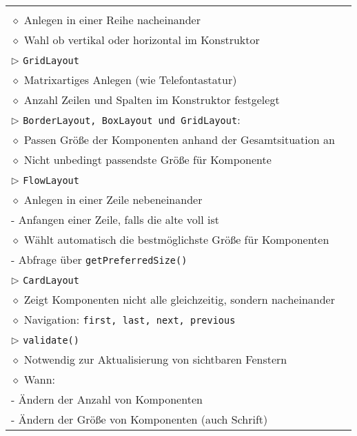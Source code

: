 \begin{longtable}{ | p{} p{} | }
{	$\rhd$ \texttt{BoxLayout} \\ 
	\hspace{0.4cm} $\diamond$ Anlegen in einer Reihe nacheinander \\
	\hspace{0.4cm} $\diamond$ Wahl ob vertikal oder horizontal im Konstruktor \\
	$\rhd$ \texttt{GridLayout} \\
	\hspace{0.4cm} $\diamond$ Matrixartiges Anlegen (wie Telefontastatur) \\
	\hspace{0.4cm} $\diamond$ Anzahl Zeilen und Spalten im Konstruktor festgelegt \\
	$\rhd$ \texttt{BorderLayout, BoxLayout und GridLayout}: \\
	\hspace{0.4cm} $\diamond$ Passen Größe der Komponenten anhand der Gesamtsituation an \\
	\hspace{0.4cm} $\diamond$ Nicht unbedingt passendste Größe für Komponente \\
	$\rhd$ \texttt{FlowLayout} \\
	\hspace{0.4cm} $\diamond$ Anlegen in einer Zeile nebeneinander \\
	\hspace{0.6cm} - Anfangen einer Zeile, falls die alte voll ist \\
	\hspace{0.4cm} $\diamond$ Wählt automatisch die bestmöglichste Größe für Komponenten \\
	\hspace{0.6cm} - Abfrage über \texttt{getPreferredSize()} \\
	$\rhd$ \texttt{CardLayout} \\
	\hspace{0.4cm} $\diamond$ Zeigt Komponenten nicht alle gleichzeitig, sondern nacheinander \\
	\hspace{0.4cm} $\diamond$ Navigation: \texttt{first, last, next, previous} \\
	$\rhd$ \texttt{validate()} \\
	\hspace{0.4cm} $\diamond$ Notwendig zur Aktualisierung von sichtbaren Fenstern \\
	\hspace{0.4cm} $\diamond$ Wann: \\
	\hspace{0.6cm} - Ändern der Anzahl von Komponenten \\
	\hspace{0.6cm} - Ändern der Grö\ss e von Komponenten (auch Schrift)} \\ \hline


\end{longtable}
